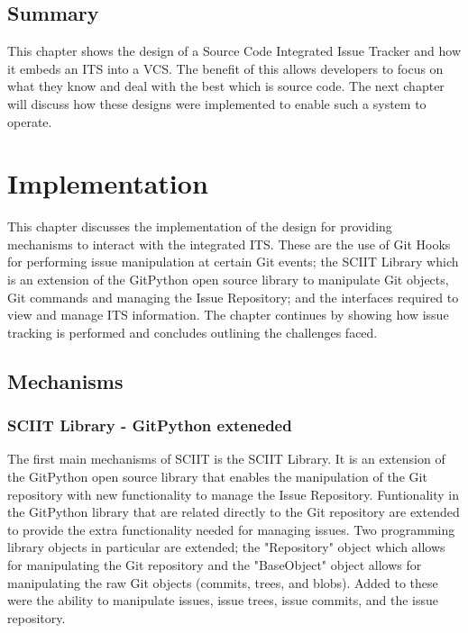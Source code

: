 \documentclass{mproj}
\begin{document}
\section{Summary}

This chapter shows the design of a Source Code Integrated Issue Tracker and how it embeds an ITS into a VCS. The benefit of this allows developers to focus on what they know and deal with the best which is source code. The next chapter will discuss how these designs were implemented to enable such a system to operate.









\chapter{Implementation}\label{implementation}

This chapter discusses the implementation of the design for providing mechanisms to interact with the integrated ITS. These are the use of Git Hooks for performing issue manipulation at certain Git events; the SCIIT Library which is an extension of the GitPython open source library to manipulate Git objects, Git commands and managing the Issue Repository; and the interfaces required to view and manage ITS information. The chapter continues by showing how issue tracking is performed and concludes outlining the challenges faced.

\section{Mechanisms}

\subsection{SCIIT Library - GitPython exteneded}

The first main mechanisms of SCIIT is the SCIIT Library. It is an extension of the GitPython open source library that enables the manipulation of the Git repository with new functionality to manage the Issue Repository. Funtionality in the GitPython library that are related directly to the Git repository are extended to provide the extra functionality needed for managing issues. Two programming library objects in particular are extended; the "Repository" object which allows for manipulating the Git repository and the "BaseObject" object allows for manipulating the raw Git objects (commits, trees, and blobs). Added to these were the ability to manipulate issues, issue trees, issue commits, and the issue repository.
\end{document}
